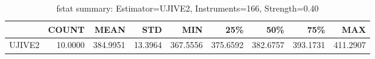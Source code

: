 \begin{table}[ht]
\centering
\caption{fstat summary: Estimator=UJIVE2, Instruments=166, Strength=0.40}
\begin{tabular}{lrrrrrrrr}
\toprule
 & COUNT & MEAN & STD & MIN & 25\% & 50\% & 75\% & MAX \\
\midrule
UJIVE2 & 10.0000 & 384.9951 & 13.3964 & 367.5556 & 375.6592 & 382.6757 & 393.1731 & 411.2907 \\
\bottomrule
\end{tabular}
\end{table}
